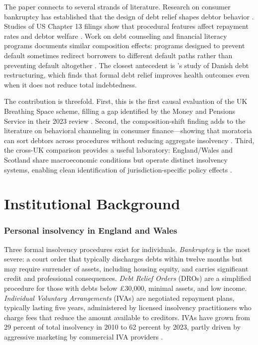 \documentclass[12pt]{article}
\begin{document}
The paper connects to several strands of literature. Research on consumer bankruptcy has established that the design of debt relief shapes debtor behavior \citep{white2007, livshits2007, chatterjee2007}. Studies of US Chapter 13 filings show that procedural features affect repayment rates and debtor welfare \citep{dobbie2015, li2019}. Work on debt counseling and financial literacy programs documents similar composition effects: programs designed to prevent default sometimes redirect borrowers to different default paths rather than preventing default altogether \citep{agarwal2010, collins2013}. The closest antecedent is \citet{daysal2023}'s study of Danish debt restructuring, which finds that formal debt relief improves health outcomes even when it does not reduce total indebtedness.

The contribution is threefold. First, this is the first causal evaluation of the UK Breathing Space scheme, filling a gap identified by the Money and Pensions Service in their 2023 review \citep{maps2023}. Second, the composition-shift finding adds to the literature on behavioral channeling in consumer finance---showing that moratoria can sort debtors across procedures without reducing aggregate insolvency \citep{skiba2019}. Third, the cross-UK comparison provides a useful laboratory: England/Wales and Scotland share macroeconomic conditions but operate distinct insolvency systems, enabling clean identification of jurisdiction-specific policy effects \citep{armour2012}.

\section{Institutional Background}

\subsubsection*{Personal insolvency in England and Wales} Three formal insolvency procedures exist for individuals. \textit{Bankruptcy} is the most severe: a court order that typically discharges debts within twelve months but may require surrender of assets, including housing equity, and carries significant credit and professional consequences. \textit{Debt Relief Orders} (DROs) are a simplified procedure for those with debts below \pounds30,000, minimal assets, and low income. \textit{Individual Voluntary Arrangements} (IVAs) are negotiated repayment plans, typically lasting five years, administered by licensed insolvency practitioners who charge fees that reduce the amount available to creditors. IVAs have grown from 29 percent of total insolvency in 2010 to 62 percent by 2023, partly driven by aggressive marketing by commercial IVA providers \citep{insolvencyservice2024}.
\end{document}
